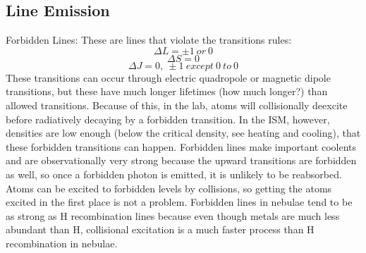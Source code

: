 \subsection{Line Emission}
Forbidden Lines:\newline
These are lines that violate the transitions rules:
\begin{displaymath}
\Delta L=\pm1\ or\ 0
\end{displaymath}
\begin{displaymath}
\Delta S=0
\end{displaymath}
\begin{displaymath}
\Delta J=0,\ \pm1\ except\ 0\ to\ 0
\end{displaymath}
These transitions can occur through electric quadropole or magnetic dipole transitions, but these 
have much longer lifetimes (how much longer?) than allowed transitions.  Because of this, in the 
lab, atoms will collisionally deexcite before radiatively decaying by a forbidden transition.  
In the ISM, however, densities are low enough (below the critical density, see heating and 
cooling), that these forbidden transitions can happen.  Forbidden lines make important coolents 
and are observationally very strong because the upward transitions are forbidden as well, so once 
a forbidden photon is emitted, it is unlikely to be reabsorbed.  Atoms can be excited to forbidden 
levels by collisions, so getting the atoms excited in the first place is not a problem.  Forbidden 
lines in nebulae tend to be as strong as H recombination lines because even though metals are 
much less abundant than H, collisional excitation is a much faster process than H recombination 
in nebulae.  

